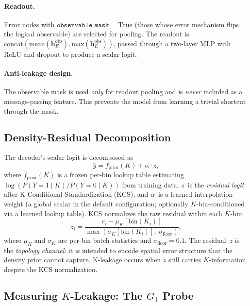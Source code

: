 \paragraph{Readout.} Error nodes with $\texttt{observable\_mask} = \mathrm{True}$ (those whose error mechanism flips the logical observable) are selected for pooling. The readout is $\mathrm{concat}(\mathrm{mean}(\mathbf{h}_{E}^{\mathrm{obs}}), \mathrm{max}(\mathbf{h}_{E}^{\mathrm{obs}}))$, passed through a two-layer MLP with ReLU and dropout to produce a scalar logit.

\paragraph{Anti-leakage design.} The observable mask is used \emph{only} for readout pooling and is \emph{never} included as a message-passing feature. This prevents the model from learning a trivial shortcut through the mask.

\subsection{Density-Residual Decomposition}

The decoder's scalar logit is decomposed as
\begin{equation}
\hat{y} = f_{\text{prior}}(K) + \alpha \cdot z,
\end{equation}
where $f_{\text{prior}}(K)$ is a frozen per-bin lookup table estimating $\log(P(Y{=}1 \mid K) / P(Y{=}0 \mid K))$ from training data, $z$~is the \emph{residual logit} after K-Conditional Standardization (KCS), and $\alpha$~is a learned interpolation weight (a global scalar in the default configuration; optionally $K$-bin-conditioned via a learned lookup table). KCS normalizes the raw residual within each $K$-bin:
\begin{equation}
z_i = \frac{r_i - \mu_{K}[\mathrm{bin}(K_i)]}{\max\!\left(\sigma_{K}[\mathrm{bin}(K_i)],\; \sigma_{\text{floor}}\right)},
\end{equation}
where $\mu_K$ and $\sigma_K$ are per-bin batch statistics and $\sigma_{\text{floor}} = 0.1$. The residual~$z$ is the \emph{topology channel}: it is intended to encode spatial error structure that the density prior cannot capture. K-leakage occurs when $z$ still carries $K$-information despite the KCS normalization.

\subsection{Measuring $K$-Leakage: The $G_1$ Probe}


